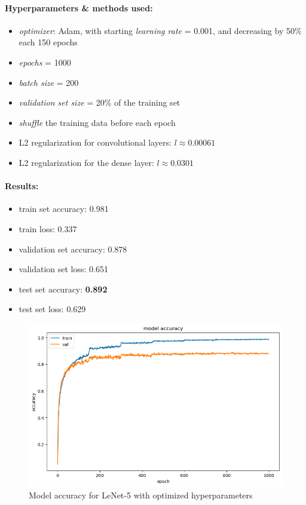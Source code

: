 \documentclass[12pt]{article}
\begin{document}
        \paragraph{Hyperparameters \& methods used:}
        \begin{itemize}
          \item \textit{optimizer}: Adam, with starting \textit{learning rate} = 0.001, and decreasing by 50\% each 150 epochs
          \item \textit{epochs} = 1000
          \item \textit{batch size} = 200
          \item \textit{validation set size} = 20\% of the training set
          \item \textit{shuffle} the training data before each epoch
          \item L2 regularization for convolutional layers: $l \approx 0.00061$
          \item L2 regularization for the dense layer: $l \approx 0.0301$
        \end{itemize}
        \paragraph{Results:}
          \begin{itemize}
            \item train set accuracy: 0.981
            \item train loss: 0.337
            \item validation set accuracy: 0.878
            \item validation set loss: 0.651
            \item test set accuracy: \textbf{0.892}
            \item test set loss: 0.629
          \end{itemize}
              \begin{figure}[H]
                \includegraphics[width=\linewidth]{images/lenet2.png}
                \caption{Model accuracy for LeNet-5 with optimized hyperparameters}
                \label{fig:lenet2}
              \end{figure}
\end{document}
